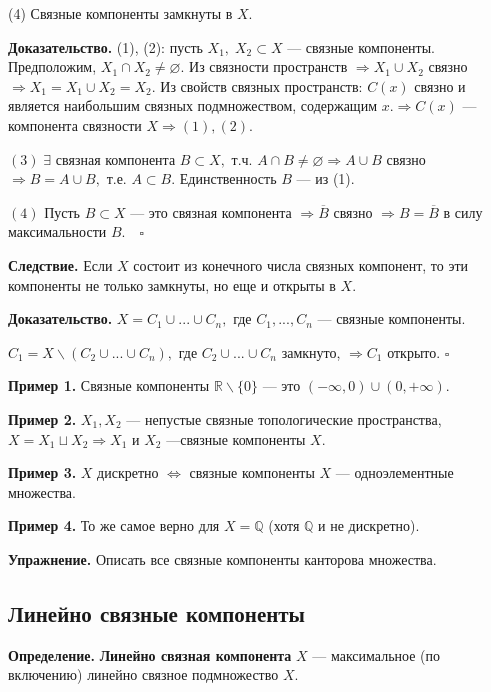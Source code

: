 \documentclass[12pt,a4paper]{article}
\begin{document}
(4) Связные компоненты замкнуты в $X.$

\textbf{Доказательство.} (1), (2): пусть $X_{1}, \; X_{2} \subset X$ --- связные компоненты. Предположим, $X_{1} \cap X_{2} \neq \varnothing.$ Из связности пространств $\Rightarrow X_{1} \cup X_{2}$ связно $\Rightarrow X_{1} = X_{1} \cup X_{2} = X_{2}.$ Из свойств связных пространств: $C(x)$ связно и является наибольшим связных подмножеством, содержащим $x. \Rightarrow C(x)$ --- компонента связности $X \Rightarrow (1), (2).$ 

$(3) \; \exists$ связная компонента $B \subset X,$ т.ч. $A \cap B \neq \varnothing \Rightarrow A \cup B$ связно $\Rightarrow B = A \cup B,$ т.е. $A \subset B.$ Единственность $B$ --- из (1).

$(4)$ Пусть $B \subset X$ --- это связная компонента $\Rightarrow \overline{B}$ связно $\Rightarrow B = \overline{B}$ в силу максимальности $B. \quad \square$ 

\textbf{Следствие.} Если $X$ состоит из конечного числа связных компонент, то эти компоненты не только замкнуты, но еще и открыты в $X.$

\textbf{Доказательство.} $X = C_{1} \cup ... \cup C_{n},$ где $C_{1}, ..., C_{n}$ --- связные компоненты. 

$C_{1} = X \backslash (C_{2} \cup ... \cup C_{n}),$ где $C_{2} \cup ... \cup C_{n}$ замкнуто, $\Rightarrow C_{1}$ открыто. $\square$ 

\textbf{Пример 1.} Связные компоненты $\mathbb{R} \backslash \{0\}$ --- это $(-\infty, 0) \cup (0, +\infty).$ 

\textbf{Пример 2.} $X_{1}, X_{2}$ --- непустые связные топологические пространства, $X = X_{1} \sqcup X_{2} \Rightarrow X_{1}$ и $X_{2}$ ---связные компоненты $X.$

\textbf{Пример 3.} $X$ дискретно $\Leftrightarrow$ связные компоненты $X$ --- одноэлементные множества.

\textbf{Пример 4.} То же самое верно для $X = \mathbb{Q}$ (хотя $\mathbb{Q}$ и не дискретно).

\textbf{Упражнение.} Описать все связные компоненты канторова множества. 

\subsection{Линейно связные компоненты}

\textbf{Определение.} \textbf{Линейно связная компонента} $X$ --- максимальное (по включению) линейно связное подмножество $X.$
\end{document}
